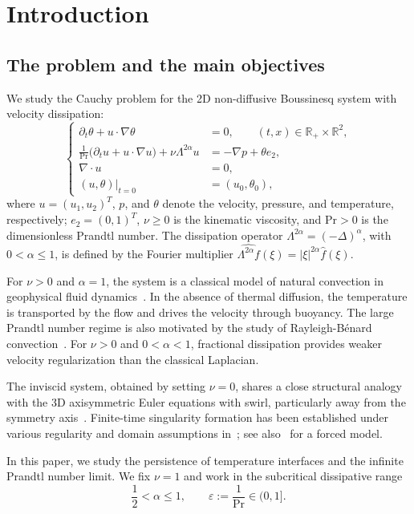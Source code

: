 \documentclass[reqno,11pt,a4paper]{amsart}
\begin{document}
\section{Introduction}
\subsection{The problem and the main objectives}
We study the Cauchy problem for the 2D
non-diffusive Boussinesq system with velocity dissipation:
\begin{equation}\tag{B$_\alpha$}\label{BoussEq}
  \left\{
  \begin{aligned}
    \partial_t\theta+u\cdot\nabla\theta
    &=0,
    \qquad (t,x)\in\mathbb{R}_+\times\mathbb{R}^2,\\
    \frac{1}{\mathrm{Pr}}
    \bigl(\partial_tu+u\cdot\nabla u\bigr)
    +\nu\Lambda^{2\alpha}u
    &=-\nabla p+\theta e_2,\\
    \nabla\cdot u&=0,\\
    (u,\theta)|_{t=0}&=(u_0,\theta_0),
  \end{aligned}
  \right.
\end{equation}
where $u=(u_1,u_2)^T$, $p$, and $\theta$ denote the velocity,
pressure, and temperature, respectively;
$e_2=(0,1)^T$, $\nu\geq 0$ is the kinematic viscosity,
and $\mathrm{Pr}>0$ is the dimensionless Prandtl number.
The dissipation operator
$\Lambda^{2\alpha}=(-\Delta)^\alpha$, with $0<\alpha\leq1$,
is defined by the Fourier multiplier $\widehat{\Lambda^{2\alpha}f}(\xi)
  =|\xi|^{2\alpha}\widehat f(\xi)$. 

For $\nu>0$ and $\alpha=1$, the system is a classical model
of natural convection in geophysical fluid
dynamics~\cite{AJM03,JP1987}.
In the absence of thermal diffusion, the temperature
is transported by the flow and drives the velocity
through buoyancy.
The large Prandtl number regime is also motivated by
the study of Rayleigh-B\'enard convection~\cite{CD1999}.
For $\nu>0$ and $0<\alpha<1$, fractional dissipation
provides weaker velocity regularization than
the classical Laplacian.

The inviscid system, obtained by setting $\nu=0$,
shares a close structural analogy with the 3D axisymmetric Euler equations with swirl, particularly away from the symmetry axis~\cite{MB02}.
Finite-time singularity formation has been established
under various regularity and domain assumptions
in~\cite{EJ20,CH21,CH23a,CH25,EP23};
see also~\cite{CLMZ25} for a forced model.

In this paper, we study the persistence of temperature
interfaces and the infinite Prandtl number limit.
We fix $\nu=1$ and work in the subcritical dissipative range
\[
  \frac12<\alpha\leq1,
  \qquad
  \varepsilon:=\frac{1}{\mathrm{Pr}}\in(0,1].
\]
\end{document}

